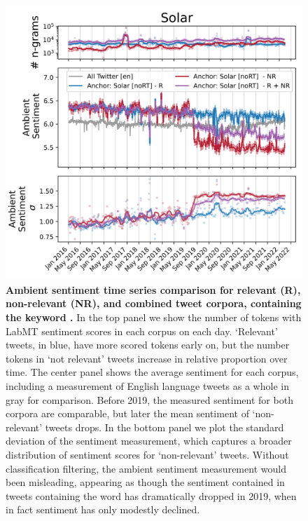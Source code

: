 









\begin{figure}[tp!]
  \centering	
    \includegraphics[width=0.98\columnwidth]{figures/Solar_sentiment_2016-01-01_2022-03-15.png}  
  \caption{
    \textbf{Ambient sentiment time series comparison for relevant  (R), non-relevant (NR), and combined tweet corpora, containing the keyword .}
    In the top panel we show the number of tokens with LabMT \cite{dodds2015human} sentiment scores in each corpus on each day.
    `Relevant' tweets, in blue, have more scored tokens early on,
    but the number tokens in `not relevant' tweets increase in relative proportion over time.
    The center panel shows the average sentiment for each corpus, including a measurement of English language tweets as a whole in gray for comparison. 
    Before 2019, the measured sentiment for both corpora are comparable, but later the mean sentiment of `non-relevant' tweets drops. 
    In the bottom panel we plot the standard deviation of the sentiment measurement, which captures a broader distribution of sentiment scores for  `non-relevant' tweets.
    Without classification filtering, the ambient sentiment measurement would been misleading, appearing as though the sentiment contained in tweets containing the word  has dramatically dropped in 2019, when in fact sentiment has only modestly declined. 
  }
  \label{fig:solar_sentiment}
\end{figure}






